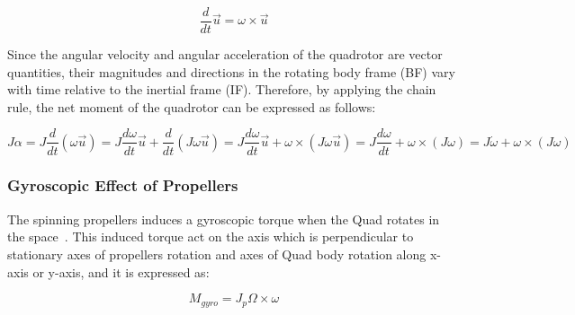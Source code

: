 \begin{equation}
    \frac{d}{dt}\vec{u} = \omega \times \vec{u}
\end{equation}




Since the angular velocity and angular acceleration of the quadrotor are vector quantities, their magnitudes and directions in the rotating body frame (BF) vary with time relative to the inertial frame (IF). Therefore, by applying the chain rule, the net moment of the quadrotor can be expressed as follows:

\begin{equation}
J\alpha = J \frac{d}{dt}(\omega \vec{u}) 
= J \frac{d\omega}{dt}\vec{u} + \frac{d}{dt}(J\omega \vec{u})
= J \frac{d\omega}{dt}\vec{u} + \omega \times (J\omega \vec{u})
= J \frac{d\omega}{dt} + \omega \times (J\omega) = J\dot{\omega} + \omega \times (J\omega)
\label{3.11}
\end{equation}






\subsubsection{Gyroscopic Effect of Propellers}

The spinning propellers induces a gyroscopic torque when the Quad rotates in the space~\cite{selfridge2014multivariable}.
This induced torque act on the axis which is perpendicular to stationary axes of propellers rotation
and axes of Quad body rotation along x-axis or y-axis, and it is expressed as:

\begin{equation}
    M_{gyro} = J_p \Omega \times \omega
    \label{3.12}
\end{equation}

